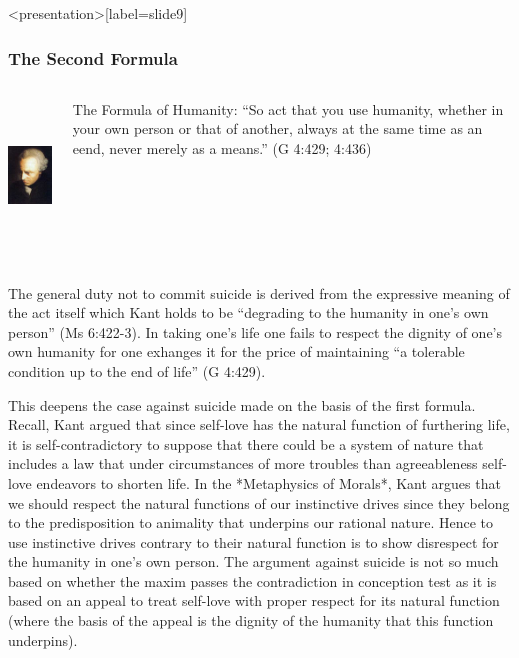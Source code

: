 \begin{frame}<presentation>[label=slide9]
    \frametitle{The Second Formula}
        \begin{columns}
            \begin{column}{3cm}
                \includegraphics[height=4cm]{../../graphics/kant.jpg}
            \end{column}
            \begin{column}{7cm}
                \alert{The Formula of Humanity}: ``So act that you use humanity, whether in your own person or that of another, always at the same time as an eend, never merely as a means.'' (G 4:429; 4:436)
            \end{column}
        \end{columns}
\end{frame}



The general duty not to commit suicide is derived from the expressive meaning of the act itself which Kant holds to be ``degrading to the humanity in one’s own person'' (Ms 6:422-3). In taking one’s life one fails to respect the dignity of one’s own humanity for one exhanges it for the price of maintaining ``a tolerable condition up to the end of life'' (G 4:429).

This deepens the case against suicide made on the basis of the first formula. Recall, Kant argued that since self-love has the natural function of furthering life, it is self-contradictory to suppose that there could be a system of nature that includes a law that under circumstances of more troubles than agreeableness self-love endeavors to shorten life. In the *Metaphysics of Morals*, Kant argues that we should respect the natural functions of our instinctive drives since they belong to the predisposition to animality that underpins our rational nature. Hence to use instinctive drives contrary to their natural function is to show disrespect for the humanity in one’s own person. The argument against suicide is not so much based on whether the maxim passes the contradiction in conception test as it is based on an appeal to treat self-love with proper respect for its natural function (where the basis of the appeal is the dignity of the humanity that this function underpins). \change

